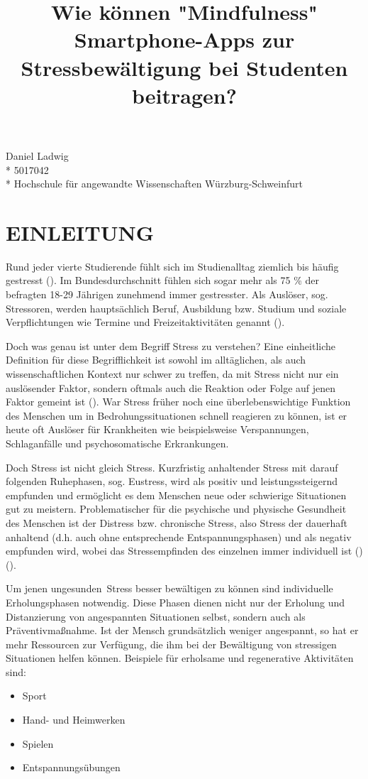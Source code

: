 \documentclass[10pt]{article}
\title{Wie können "Mindfulness" Smartphone-Apps zur Stressbewältigung bei Studenten beitragen? }
\makeatletter
\renewcommand{\maketitle}{\bgroup\setlength{\parindent}{0pt}
\begin{flushleft}
  \Large{\textbf{\@title}}
\end{flushleft}\egroup
}
\newcommand{\zit}[1]{(\cite{#1})}
\makeatother
\begin{document}
\maketitle

\begin{flushleft}
Daniel Ladwig  \\* 
5017042 \\* 
Hochschule für angewandte Wissenschaften Würzburg-Schweinfurt
\end{flushleft}

\section{EINLEITUNG}

Rund jeder vierte Studierende fühlt sich im Studienalltag ziemlich bis häufig gestresst \zit{gesundheitStudis2017}. Im Bundesdurchschnitt fühlen sich sogar mehr als 75 \% der befragten 18-29 Jährigen zunehmend immer gestresster. Als Auslöser, sog. Stressoren, werden hauptsächlich Beruf, Ausbildung bzw. Studium und soziale Verpflichtungen wie Termine und Freizeitaktivitäten genannt \zit{tkEntspannDich2016}. 

Doch was genau ist unter dem Begriff Stress zu verstehen? Eine einheitliche Definition für diese Begrifflichkeit ist sowohl im alltäglichen, als auch wissenschaftlichen Kontext nur schwer zu treffen, da mit Stress nicht nur ein auslösender Faktor, sondern oftmals auch die Reaktion oder Folge auf jenen Faktor gemeint ist \zit{StressAllgemein}. War Stress früher noch eine überlebenswichtige Funktion des Menschen um in Bedrohungssituationen schnell reagieren zu können, ist er heute oft Auslöser für Krankheiten wie beispielsweise Verspannungen, Schlaganfälle und psychosomatische Erkrankungen. 

Doch Stress ist nicht gleich Stress. Kurzfristig anhaltender Stress mit darauf folgenden Ruhephasen, sog. Eustress, wird als positiv und leistungssteigernd empfunden und ermöglicht es dem Menschen neue oder schwierige Situationen gut zu meistern. 
Problematischer für die psychische und physische Gesundheit des Menschen ist der Distress bzw. chronische Stress, also Stress der dauerhaft anhaltend (d.h. auch ohne entsprechende Entspannungsphasen) und als negativ empfunden wird, wobei das Stressempfinden des einzelnen immer individuell ist \zit{StressGrundwissen} \zit{ChronischerStress}. 

Um jenen \grqq ungesunden\grqq\  Stress besser bewältigen zu können sind individuelle Erholungsphasen notwendig. Diese Phasen dienen nicht nur der Erholung  und Distanzierung von angespannten Situationen selbst, sondern auch als Präventivmaßnahme. Ist der Mensch grundsätzlich weniger angespannt, so hat er mehr Ressourcen zur Verfügung, die ihm bei der Bewältigung von stressigen Situationen helfen können. 
Beispiele für erholsame und regenerative Aktivitäten sind:
\begin{itemize}[itemsep=0.5mm, parsep=0pt]
\item  Sport
\item  Hand- und Heimwerken
\item  Spielen
\item Entspannungsübungen
\end{itemize}
\end{document}
